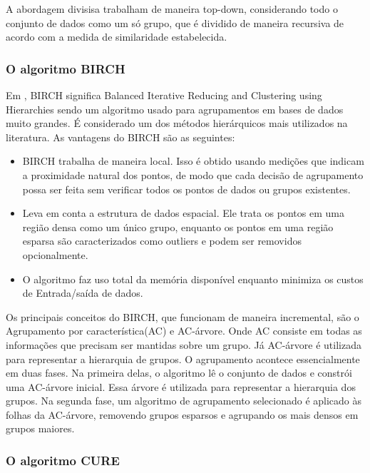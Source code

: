 A abordagem divisisa trabalham de maneira top-down, considerando todo o conjunto de dados como um só
grupo, que é dividido de maneira recursiva de acordo com a medida de similaridade
estabelecida.

\subsubsection{O algoritmo BIRCH}

Em \cite{Zhang1996}, BIRCH significa Balanced Iterative Reducing and Clustering using Hierarchies sendo um algoritmo usado para agrupamentos em bases de dados muito grandes. É considerado um dos métodos hierárquicos mais utilizados na literatura. As vantagens do BIRCH são as seguintes:

\begin{itemize}
	\item BIRCH trabalha de maneira local. Isso é obtido usando medições que indicam a proximidade natural dos pontos, de modo que cada decisão de agrupamento possa ser feita sem verificar todos os pontos de dados ou grupos existentes.
	\item Leva em conta a estrutura de dados espacial. Ele trata os pontos em uma região densa como um único grupo, enquanto os pontos em uma região esparsa são caracterizados como outliers e podem ser removidos opcionalmente.
	\item O algoritmo faz uso total da memória disponível enquanto minimiza os custos de Entrada/saída de dados.
\end{itemize}

Os principais conceitos do BIRCH, que funcionam de maneira incremental, são o Agrupamento por característica(AC) e AC-árvore. Onde AC consiste em todas as informações que precisam ser mantidas sobre um grupo.
Já AC-árvore é utilizada para representar a hierarquia de grupos.
O agrupamento acontece essencialmente em duas fases. Na primeira delas, o algoritmo lê o conjunto de dados e constrói uma AC-árvore inicial. Essa árvore é utilizada para representar a hierarquia dos grupos. Na segunda fase, um algoritmo de agrupamento selecionado é aplicado às folhas da AC-árvore, removendo grupos esparsos e agrupando os mais densos em grupos maiores.

\subsubsection{O algoritmo CURE}


